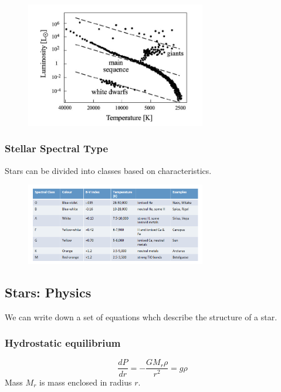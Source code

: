 \documentclass[a4paper]{article} %
\begin{document}
\begin{figure}[h]
\centering
\includegraphics[width=0.7\textwidth]{images/hr-diagram.png}
\end{figure}

\subsubsection{Stellar Spectral Type}
Stars can be divided into classes based on characteristics.

\begin{figure}[h]
\centering
\includegraphics[width=0.7\textwidth]{images/spectral-types.png}
\end{figure}

\subsection{Stars: Physics}
We can write down a set of equations whch describe the structure of a star.

\subsubsection{Hydrostatic equilibrium}

\begin{equation}
\frac{dP}{dr}=-\frac{GM_r \rho}{r^2}=g\rho
\end{equation}
Mass $M_r$ is mass enclosed in radius $r$.
\end{document}
